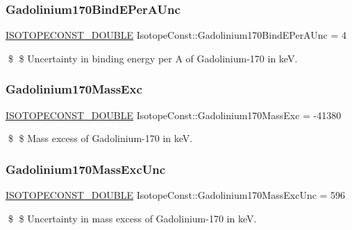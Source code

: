 \subsubsection{\texorpdfstring{Gadolinium170\+Bind\+E\+Per\+A\+Unc}{Gadolinium170BindEPerAUnc}}
{\footnotesize\ttfamily \mbox{\hyperlink{group___isotope_const-_macros_ga8f45a7272ce02c0b4c65c44636ed719a}{I\+S\+O\+T\+O\+P\+E\+C\+O\+N\+S\+T\+\_\+\+D\+O\+U\+B\+LE}} Isotope\+Const\+::\+Gadolinium170\+Bind\+E\+Per\+A\+Unc = 4}

\$ \$ Uncertainty in binding energy per A of Gadolinium-\/170 in keV. \mbox{\label{group___isotope_const-_gadolinium-_gd170_gaf649d5582c8c99546716d7b6554c7b90}} 
\subsubsection{\texorpdfstring{Gadolinium170\+Mass\+Exc}{Gadolinium170MassExc}}
{\footnotesize\ttfamily \mbox{\hyperlink{group___isotope_const-_macros_ga8f45a7272ce02c0b4c65c44636ed719a}{I\+S\+O\+T\+O\+P\+E\+C\+O\+N\+S\+T\+\_\+\+D\+O\+U\+B\+LE}} Isotope\+Const\+::\+Gadolinium170\+Mass\+Exc = -\/41380}

\$ \$ Mass excess of Gadolinium-\/170 in keV. \mbox{\label{group___isotope_const-_gadolinium-_gd170_ga25b6683101628968d66ce0b3a6c98a94}} 
\subsubsection{\texorpdfstring{Gadolinium170\+Mass\+Exc\+Unc}{Gadolinium170MassExcUnc}}
{\footnotesize\ttfamily \mbox{\hyperlink{group___isotope_const-_macros_ga8f45a7272ce02c0b4c65c44636ed719a}{I\+S\+O\+T\+O\+P\+E\+C\+O\+N\+S\+T\+\_\+\+D\+O\+U\+B\+LE}} Isotope\+Const\+::\+Gadolinium170\+Mass\+Exc\+Unc = 596}

\$ \$ Uncertainty in mass excess of Gadolinium-\/170 in keV. \mbox{\label{group___isotope_const-_gadolinium-_gd170_gaa57742dc88f6b0e2da0ba5a7bac4acda}} 

